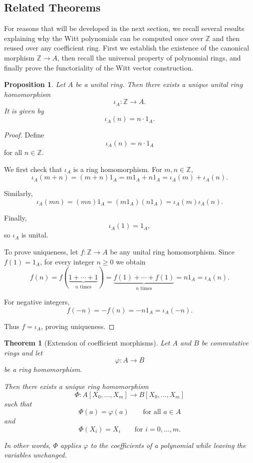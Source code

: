 \documentclass[oneside, a4paper, onecolumn, 11pt]{article}
\newtheorem{theorem}{Theorem}
\newtheorem{proposition}{Proposition}
\theoremstyle{definition}
\begin{document}
\subsection{Related Theorems}


For reasons that will be developed in the next section, we recall several
results explaining why the Witt polynomials can be computed once over
$\mathbb{Z}$ and then reused over any coefficient ring. First we establish
the existence of the canonical morphism $\mathbb{Z}\to A$, then recall the
universal property of polynomial rings, and finally prove the functoriality
of the Witt vector construction.

\begin{proposition}\label{prop:Z_to_A}
Let $A$ be a unital ring. Then there exists a unique unital ring homomorphism
\[\iota_A:\mathbb{Z}\to A.\]
It is given by \[\iota_A(n)=n\cdot 1_A. \]
\end{proposition}

\begin{proof}
Define \[\iota_A(n)=n\cdot 1_A\]
for all $n\in\mathbb{Z}$.

We first check that $\iota_A$ is a ring homomorphism. For $m,n\in\mathbb{Z}$,
\[\iota_A(m+n)=(m+n)1_A=m1_A+n1_A=\iota_A(m)+\iota_A(n).\]

Similarly, \[\iota_A(mn)=(mn)1_A=(m1_A)(n1_A)=\iota_A(m)\iota_A(n).\]

Finally, \[\iota_A(1)=1_A,\]
so $\iota_A$ is unital.

To prove uniqueness, let $f:\mathbb{Z}\to A$ be any unital ring homomorphism.
Since $f(1)=1_A$, for every integer $n\ge0$ we obtain
\[f(n)=f(\underbrace{1+\cdots+1}_{n\text{ times}})=\underbrace{f(1)+\cdots+f(1)}_{n\text{ times}} =n1_A=\iota_A(n).\]

For negative integers, \[f(-n)=-f(n)=-n1_A=\iota_A(-n).\]

Thus $f=\iota_A$, proving uniqueness.
\end{proof}

\begin{theorem}[Extension of coefficient morphisms]
\label{thm:poly_extension}
Let $A$ and $B$ be commutative rings and let \[\varphi:A\to B\]
be a ring homomorphism.

Then there exists a unique ring homomorphism \[\Phi:A[X_0,\dots,X_m]\to B[X_0,\dots,X_m] \]
such that \[\Phi(a)=\varphi(a)\qquad\text{for all }a\in A \]
and \[\Phi(X_i)=X_i\qquad\text{for }i=0,\dots,m.\]

In other words, $\Phi$ applies $\varphi$ to the coefficients of a polynomial
while leaving the variables unchanged.
\end{theorem}
\end{document}
